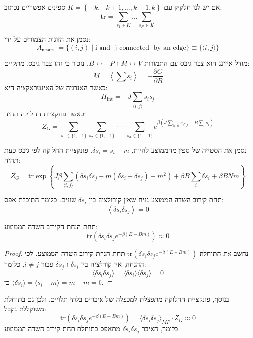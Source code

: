 \documentclass{tstextbook}
\begin{document}
\begin{symbolize}
אם יש לנו חלקיק עם \(K=\left\{  -k,-k+1,\dots,k-1,k  \right\}\) ספינים אפשריים נכתוב:
$$\text{tr}=\sum_{s_{1} \in K}\dots \sum_{s_{N}\in K}$$

\end{symbolize}
\begin{symbolize}
נסמן את הזוגות הצמודים על ידי:
$$A_{\mathsf{nearest}}=\{(i,j)\mid{\textrm{i~and ~j~connected ~by~an~edge}}\}\equiv\{\langle i,j\rangle\}$$

\end{symbolize}
\begin{reminder}
מודל איזינג הוא צבר גיבס עם התמורות \(M\leftrightarrow V\) ו-\(B\leftrightarrow -P\). נזכור כי זהו צבר גיבס. מתקיים:
$$M=\left\langle\sum s_{i}\right\rangle=-{\frac{\partial G}{\partial B}}$$
כאשר האנרגיה של האינטראקציה היא:
$${H}_{\mathrm{int}}=-J\sum_{\langle i,j\rangle}s_{i}s_{j}$$
כאשר פונקציית החלוקה תהיה:
$$Z_{G}=\sum_{s_{1}\in\{1,-1\}}\sum_{s_{2}\in\{1,-1\}}\cdot\cdot\cdot\sum_{s_{3}\in\{1,-1\}}e^{\beta\left(J\sum_{\langle i,j\rangle}s_{i}s_{j}+B\sum_{i}s_{i}\right)}$$

\end{reminder}
\begin{symbolize}
נסמן את הסטייה של ספין מהממוצע להיות, \(\delta s_{i}=s_{i}-m\). פונקציית החלוקה לפי גיבס כעת תהיה:
$$Z_{G}=\mathrm{tr}\exp\left\{J\beta\sum_{\langle i,j\rangle}\left(\delta s_{i}\delta s_{j}+m\left(\delta s_{i}+\delta s_{j}\right)+m^{2}\right)+\beta B\sum_{i}\delta s_{i}+\beta B N m\right\}$$

\end{symbolize}
\begin{definition}
תחת קירוב השדה הממוצע נניח שאין קורולציה בין \(\delta s_{i}\) שונים. כלומר התוכלת אפס:
$$\left\langle\delta{s_{i}}\delta{s_{j}}\right\rangle=0$$

\end{definition}
\begin{corollary}
תחת הנחת הקירוב השדה הממוצע:
$$\mathrm{tr}\left(\delta s_{i}\delta s_{j}e^{-\beta(E-B m)}\right)\approx 0$$

\end{corollary}
\begin{proof}
נחשב את התוחלת \(\mathrm{tr}\left(\delta s_{i}\delta s_{j}e^{-\beta(E-B m)}\right)\) תחת הנחת קירוב השדה הממוצע. לפי ההנחה, אין קורלציה בין \(\delta s_i\) ו-\(\delta s_j\) עבור \(i \neq j\), כלומר:
$$\langle \delta s_i \delta s_j \rangle = \langle \delta s_i \rangle \langle \delta s_j \rangle = 0
$$
כי \(\langle \delta s_i \rangle = \langle s_i - m \rangle = m - m = 0\).

\end{proof}
בנוסף, פונקציית החלוקה מתפצלת למכפלה של איברים בלתי תלויים, ולכן גם בתוחלת משוקללת נקבל:
$$\mathrm{tr}\left(\delta s_{i}\delta s_{j}e^{-\beta(E-B m)}\right) = \langle \delta s_i \delta s_j \rangle_{MF} \cdot Z_G \approx 0
$$
כלומר, האיבר \(\delta s_i \delta s_j\) מתאפס בתוחלת תחת קירוב השדה הממוצע.
\end{document}
